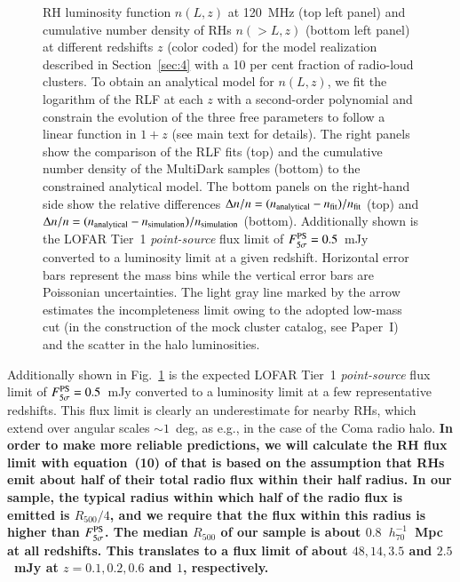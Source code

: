 \documentclass[useAMS,usenatbib]{mn2e}
\begin{document}
\begin{figure}
\caption{RH luminosity function $n(L,z)$ at 120~MHz (top left panel) and
  cumulative number density of RHs $n(>L,z)$ (bottom left panel) at different
  redshifts $z$ (color coded) for the model realization described in
  Section~\ref{sec:4} with a 10 per cent fraction of radio-loud clusters. To
  obtain an analytical model for $n(L,z)$, we fit the logarithm of the RLF at
  each $z$ with a second-order polynomial and constrain the evolution of the
  three free parameters to follow a linear function in $1+z$ (see main text for
  details). The right panels show the comparison of the RLF fits (top) and the
  cumulative number density of the MultiDark samples (bottom) to the constrained
  analytical model.  The bottom panels on the right-hand side show the relative
  differences $\Delta n / n = (n_{{\mathrm{analytical}}} -
  n_{{\mathrm{fit}}})/n_{{\mathrm{fit}}}$ (top) and $\Delta n / n = (n_{{\mathrm{analytical}}}
  - n_{{\mathrm{simulation}}})/n_{{\mathrm{simulation}}}$ (bottom).  Additionally shown is
  the LOFAR Tier~1 \emph{point-source} flux limit of
  $F_{5\sigma}^{{\mathrm{PS}}}=0.5$~mJy \citep{2012JApA..tmp...34R} converted to a
  luminosity limit at a given redshift. Horizontal error bars represent the mass
  bins while the vertical error bars are Poissonian uncertainties.  The light
  gray line marked by the arrow estimates the incompleteness limit owing to the
  adopted low-mass cut (in the construction of the mock cluster catalog, see
  Paper~I) and the scatter in the halo luminosities.}
\label{fig:RLF_120}
\end{figure} 

Additionally shown in Fig.~\ref{fig:RLF_120} is the expected LOFAR Tier~1
\emph{point-source} flux limit of $F_{5\sigma}^{{\mathrm{PS}}}=0.5$~mJy
\citep{2012JApA..tmp...34R} converted to a luminosity limit at a few
representative redshifts. This flux limit is clearly an underestimate for nearby
RHs, which extend over angular scales $\sim1$~deg, as e.g., in the case of the
Coma radio halo. {\bf In order to make more reliable predictions, we will
  calculate the RH flux limit with equation~(10) of \cite{2010A&A...509A..68C}
  that is based on the assumption that RHs emit about half of their total radio
  flux within their half radius. In our sample, the typical radius within which
  half of the radio flux is emitted is $R_{500}/4$, and we require that the flux
  within this radius is higher than $F_{5\sigma}^{{\mathrm{PS}}}$. The median
  $R_{500}$ of our sample is about $0.8$~$h_{70}^{-1}$~Mpc at all
  redshifts. This translates to a flux limit of about $48, 14, 3.5$ and
  $2.5$~mJy at $z = 0.1, 0.2, 0.6$ and $1$, respectively.}
\end{document}
